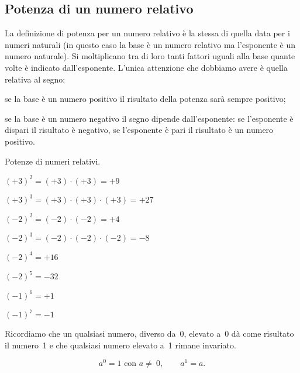 
\subsection{Potenza di un numero relativo}

La definizione di potenza per un numero relativo è la stessa di quella data per 
i numeri naturali
(in questo caso la base è un numero relativo ma l'esponente è un numero 
naturale).
Si moltiplicano tra di loro tanti fattori uguali alla base quante volte è 
indicato dall'esponente.
L'unica attenzione che dobbiamo avere è quella relativa al segno:
 \begin{itemize*}
 \item se la base è un numero positivo il risultato della potenza sarà sempre 
positivo;
 \item se la base è un numero negativo il segno dipende dall'esponente: se 
l'esponente è dispari il
risultato è negativo, se l'esponente è pari il risultato è un numero positivo.
 \end{itemize*}

\begin{exrig}
 \begin{esempio}
 Potenze di numeri relativi.
 \begin{multicols}{2}
 \begin{itemize*}
 \item \((+3)^2=(+3)\cdot(+3)=+9\)
 \item \((+3)^3=(+3)\cdot(+3)\cdot(+3)=+27\)
 \item \((-2)^2=(-2)\cdot(-2)=+4\)
 \item \((-2)^3=(-2)\cdot(-2)\cdot(-2)=-8\)
 \item \((-2)^4=+16\)
 \item \((-2)^5=-32\)
 \item \((-1)^6=+1\)
 \item \((-1)^7=-1\)
 \end{itemize*}
\end{multicols}
 \end{esempio}

\end{exrig}

Ricordiamo che un qualsiasi numero, diverso da~0, elevato a~0 dà come risultato 
il numero~1 e che qualsiasi
numero elevato a~1 rimane invariato.

\[a^0=1\text{ con }a\neq~0,\qquad a^1=a.\]

